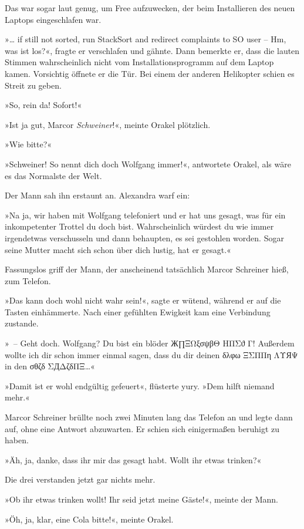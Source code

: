 Das war sogar laut genug, um Free aufzuwecken, der beim Installieren des neuen Laptops eingeschlafen war.

»… if still not sorted, run StackSort and redirect complaints to SO user -- Hm, was ist los?«, fragte er verschlafen und gähnte. Dann bemerkte er, dass die lauten Stimmen wahrscheinlich nicht vom Installationsprogramm auf dem Laptop kamen. Vorsichtig öffnete er die Tür. Bei einem der anderen Helikopter schien es Streit zu geben.

»So, rein da! Sofort!«

»Ist ja gut, Marcor \textit{Schweiner}!«, meinte Orakel plötzlich.

»Wie bitte?«

»Schweiner! So nennt dich doch Wolfgang immer!«, antwortete Orakel, als wäre es das Normalste der Welt.

Der Mann sah ihn erstaunt an. Alexandra warf ein:

»Na ja, wir haben mit Wolfgang telefoniert und er hat uns gesagt, was für ein inkompetenter Trottel du doch bist. Wahrscheinlich würdest du wie immer irgendetwas verschusseln und dann behaupten, es sei gestohlen worden. Sogar seine Mutter macht sich schon über dich lustig, hat er gesagt.«

Fassungslos griff der Mann, der anscheinend tatsächlich Marcor Schreiner hieß, zum Telefon.

»Das kann doch wohl nicht wahr sein!«, sagte er wütend, während er auf die Tasten einhämmerte. Nach einer gefühlten Ewigkeit kam eine Verbindung zustande.

»~– Geht doch. Wolfgang? Du bist ein blöder Ж∏ΞΩξσψβΘ ΗΠΣϑ Γ! Außerdem wollte ich dir schon immer einmal sagen, dass du dir deinen δλφω ΞΣΠΠη ΛΥЯΨ in den σθζδ ΣДΔζδΠΞ…«

»Damit ist er wohl endgültig gefeuert«, flüsterte yury. »Dem hilft niemand mehr.«

Marcor Schreiner brüllte noch zwei Minuten lang das Telefon an und legte dann auf, ohne eine Antwort abzuwarten. Er schien sich einigermaßen beruhigt zu haben.

»Äh, ja, danke, dass ihr mir das gesagt habt. Wollt ihr etwas trinken?«

Die drei verstanden jetzt gar nichts mehr.

»Ob ihr etwas trinken wollt! Ihr seid jetzt meine Gäste!«, meinte der Mann.

»Öh, ja, klar, eine Cola bitte!«, meinte Orakel.

